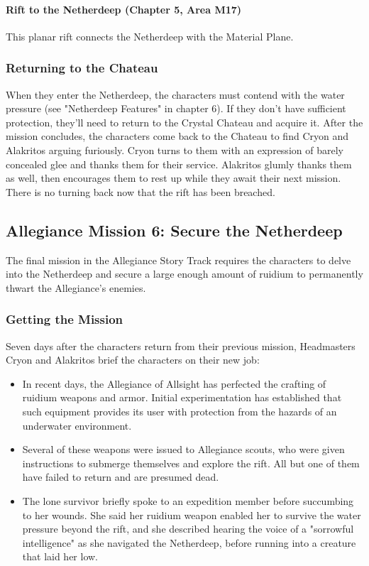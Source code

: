 \documentclass[10pt,a4,twoside,twocolumn,openany,nodeprecatedcode]{dndbook}
\begin{document}
\paragraph{Rift to the Netherdeep (Chapter 5, Area M17)}
This planar rift connects the Netherdeep with the Material Plane.
\subsubsection{Returning to the Chateau}
When they enter the Netherdeep, the characters must contend with the water pressure (see "Netherdeep Features" in chapter 6). If they don't have sufficient protection, they'll need to return to the Crystal Chateau and acquire it.
After the mission concludes, the characters come back to the Chateau to find Cryon and Alakritos arguing furiously. Cryon turns to them with an expression of barely concealed glee and thanks them for their service. Alakritos glumly thanks them as well, then encourages them to rest up while they await their next mission. There is no turning back now that the rift has been breached.
\subsection{Allegiance Mission 6: Secure the Netherdeep}
The final mission in the Allegiance Story Track requires the characters to delve into the Netherdeep and secure a large enough amount of ruidium to permanently thwart the Allegiance's enemies.
\subsubsection{Getting the Mission}
Seven days after the characters return from their previous mission, Headmasters Cryon and Alakritos brief the characters on their new job:
\begin{itemize}

\item In recent days, the Allegiance of Allsight has perfected the crafting of ruidium weapons and armor. Initial experimentation has established that such equipment provides its user with protection from the hazards of an underwater environment.
\item Several of these weapons were issued to Allegiance scouts, who were given instructions to submerge themselves and explore the rift. All but one of them have failed to return and are presumed dead.
\item The lone survivor briefly spoke to an expedition member before succumbing to her wounds. She said her ruidium weapon enabled her to survive the water pressure beyond the rift, and she described hearing the voice of a "sorrowful intelligence" as she navigated the Netherdeep, before running into a creature that laid her low.
\end{itemize}
\end{document}
